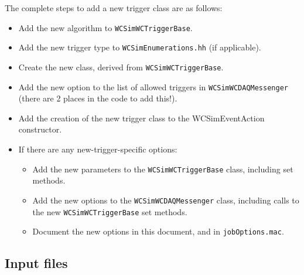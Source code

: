 The complete steps to add a new trigger class are as follows:
\begin{itemize}
\item Add the new algorithm to \texttt{WCSimWCTriggerBase}.
\item Add the new trigger type to \texttt{WCSimEnumerations.hh} (if applicable).
\item Create the new class, derived from \texttt{WCSimWCTriggerBase}.
\item Add the new option to the list of allowed triggers in \texttt{WCSimWCDAQMessenger} (there are 2 places in the code to add this!). 
\item Add the creation of the new trigger class to the WCSimEventAction constructor.
\item If there are any new-trigger-specific options:
  \begin{itemize}
  \item Add the new parameters to the \texttt{WCSimWCTriggerBase} class, including set methods.
  \item Add the new options to the \texttt{WCSimWCDAQMessenger} class, including calls to the new \texttt{WCSimWCTriggerBase} set methods.
  \item Document the new options in this document, and in \texttt{jobOptions.mac}.
  \end{itemize}
\end{itemize}

\subsection{Input files}
\label{sec:daq:options}

